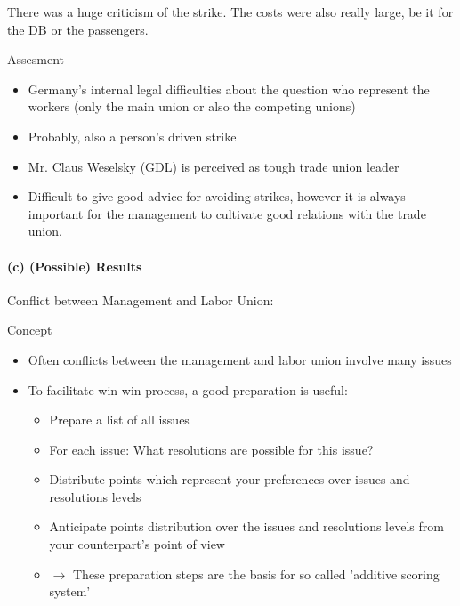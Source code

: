 There was a huge criticism of the strike. The costs were also really large,
be it for the DB or the passengers.

\vspace{1\baselineskip}

Assesment
\begin{itemize}
    \item Germany's internal legal difficulties about the question who represent
        the workers (only the main union or also the competing unions)
    \item Probably, also a person's driven strike
    \item Mr. Claus Weselsky (GDL) is perceived as tough trade union leader
    \item Difficult to give good advice for avoiding strikes, however it is
        always important for the management to cultivate good relations with
        the trade union.
\end{itemize}

\paragraph{(c) (Possible) Results}

Conflict between Management and Labor Union:

\vspace{1\baselineskip}

Concept
\begin{itemize}
    \item Often conflicts between the management and labor union involve many
        issues
    \item To facilitate win-win process, a good preparation is useful:
        \begin{itemize}
            \item Prepare a list of all issues
            \item For each issue: What resolutions are possible for this issue?
            \item Distribute points which represent your preferences over issues
                and resolutions levels
            \item Anticipate points distribution over the issues and resolutions
                levels from your counterpart's point of view
            \item $\rightarrow$ These preparation steps are the basis for so
                called 'additive scoring system'
        \end{itemize}
\end{itemize}


